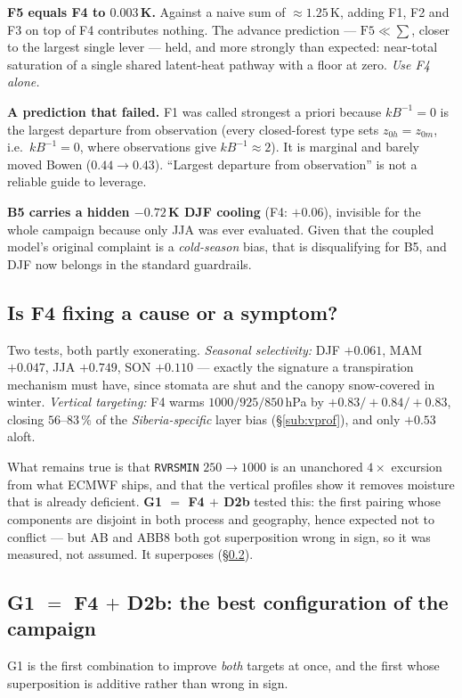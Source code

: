 \documentclass[10pt]{article}
\begin{document}
\textbf{F5 equals F4 to $0.003$\,K.} Against a naive sum of $\approx1.25$\,K, adding F1, F2 and
F3 on top of F4 contributes nothing. The advance prediction --- $\text{F5}\ll\sum$, closer to
the largest single lever --- held, and more strongly than expected: near-total saturation of a
single shared latent-heat pathway with a floor at zero. \emph{Use F4 alone.}

\textbf{A prediction that failed.} F1 was called strongest a priori because $kB^{-1}=0$ is the
largest departure from observation (every closed-forest type sets $z_{0h}=z_{0m}$, i.e.\ $kB^{-1}=0$, where observations give $kB^{-1}\approx2$). It is marginal and barely moved Bowen
($0.44\to0.43$). ``Largest departure from observation'' is not a reliable guide to leverage.

\textbf{B5 carries a hidden $-0.72$\,K DJF cooling} (F4: $+0.06$), invisible for the whole
campaign because only JJA was ever evaluated. Given that the coupled model's original
complaint is a \emph{cold-season} bias, that is disqualifying for B5, and DJF now belongs in
the standard guardrails.

\subsection{Is F4 fixing a cause or a symptom?}\label{sub:f4cause}
Two tests, both partly exonerating. \emph{Seasonal selectivity:} DJF $+0.061$, MAM $+0.047$,
JJA $\mathbf{+0.749}$, SON $+0.110$ --- exactly the signature a transpiration mechanism must
have, since stomata are shut and the canopy snow-covered in winter. \emph{Vertical targeting:}
F4 warms $1000/925/850$\,hPa by $+0.83/+0.84/+0.83$, closing $56$--$83\,\%$ of the
\emph{Siberia-specific} layer bias (\S\ref{sub:vprof}), and only $+0.53$ aloft.

What remains true is that \texttt{RVRSMIN} $250\to1000$ is an unanchored $4\times$ excursion
from what ECMWF ships, and that the vertical profiles show it removes moisture that is already
deficient. \textbf{G1 $=$ F4 $+$ D2b} tested this: the first pairing whose components are
disjoint in both process and geography, hence expected not to conflict --- but AB and ABB8 both
got superposition wrong in sign, so it was measured, not assumed. It superposes
(\S\ref{sub:g1}).

\subsection{G1 $=$ F4 $+$ D2b: the best configuration of the campaign}\label{sub:g1}
G1 is the first combination to improve \emph{both} targets at once, and the first whose
superposition is additive rather than wrong in sign.
\end{document}
